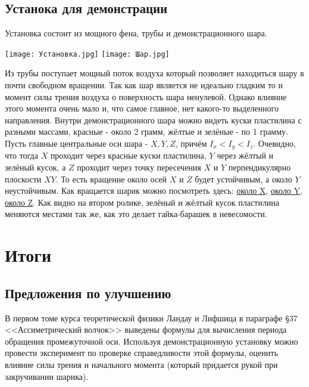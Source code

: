 \documentclass{article}
\begin{document}
\subsection{Устанока для демонстрации}
Установка состоит из мощного фена, трубы и демонстрационного шара.
\begin{center}
\texttt{[image: Установка.jpg]}
\texttt{[image: Шар.jpg]}
\end{center}
\par
Из трубы поступает мощный поток воздуха который позволяет находиться шару в почти свободном вращении. Так как шар является не идеально гладким то и момент силы трения воздуха о поверхность шара ненулевой. Однако влияние этого момента очень мало и, что самое главное, нет какого-то выделенного направления. Внутри демонстрационного шара можно видеть куски пластилина с разными массами, красные - около 2 грамм, жёлтые и зелёные - по 1 грамму. Пусть главные центральные оси шара - $X, Y, Z$, причём $I_x < I_y < I_z$. Очевидно, что тогда $X$ проходит через красные куски пластилина, $Y$ через жёлтый и зелёный кусок, а $Z$ проходит через точку пересечения $X$ и $Y$ перпендикулярно плоскости $XY$. То есть вращение около осей $X$ и $Z$ будет устойчивым, а около $Y$ неустойчивым. Как вращается шарик можно посмотреть здесь: \href{https://github.com/sevaphasol/vpv-mechanics/blob/main/%D0%9E%D0%BA%D0%BE%D0%BB%D0%BE%20X.mp4}{около X}, \href{https://github.com/sevaphasol/vpv-mechanics/blob/main/%D0%9E%D0%BA%D0%BE%D0%BB%D0%BE%20Y.mp4}{около Y}, \href{https://github.com/sevaphasol/vpv-mechanics/blob/main/%D0%9E%D0%BA%D0%BE%D0%BB%D0%BE%20Z.mp4}{около Z}. Как видно на втором ролике, зелёный и жёлтый кусок пластилина меняются местами так же, как это делает гайка-барашек в невесомости.

\section{Итоги}
\subsection{Предложения по улучшению}
В первом томе курса теоретической физики Ландау и Лифшица в параграфе §37 <<Ассиметрический волчок>> выведены формулы для вычисления периода обращения промежуточной оси. Используя демонстрационную установку можно провести эксперимент по проверке справедливости этой формулы, оценить влияние силы трения и начального момента (который придается рукой при закручивании шарика). 
\end{document}
